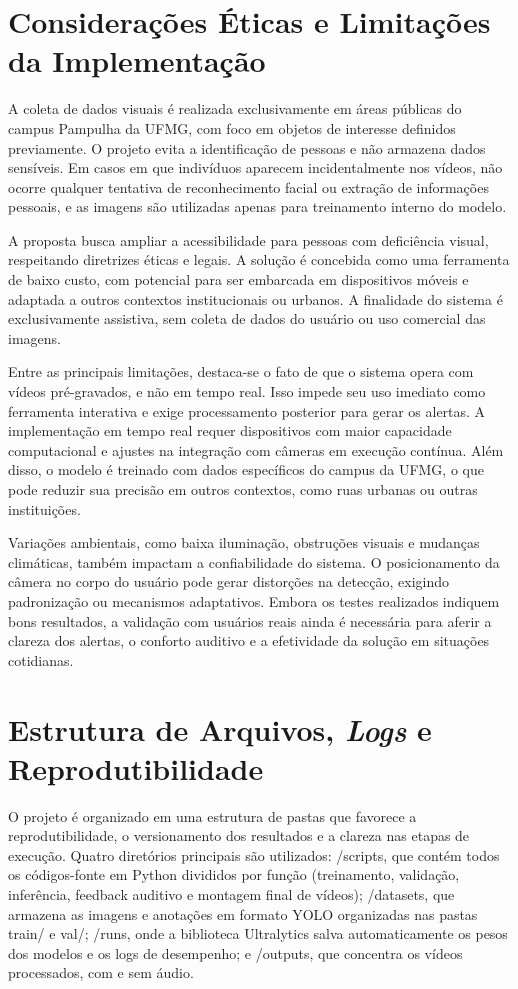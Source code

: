 \section{Considerações Éticas e Limitações da Implementação}

A coleta de dados visuais é realizada exclusivamente em áreas públicas do campus Pampulha da UFMG, com foco em objetos de interesse definidos previamente. O projeto evita a identificação de pessoas e não armazena dados sensíveis. Em casos em que indivíduos aparecem incidentalmente nos vídeos, não ocorre qualquer tentativa de reconhecimento facial ou extração de informações pessoais, e as imagens são utilizadas apenas para treinamento interno do modelo.

A proposta busca ampliar a acessibilidade para pessoas com deficiência visual, respeitando diretrizes éticas e legais. A solução é concebida como uma ferramenta de baixo custo, com potencial para ser embarcada em dispositivos móveis e adaptada a outros contextos institucionais ou urbanos. A finalidade do sistema é exclusivamente assistiva, sem coleta de dados do usuário ou uso comercial das imagens.

Entre as principais limitações, destaca-se o fato de que o sistema opera com vídeos pré-gravados, e não em tempo real. Isso impede seu uso imediato como ferramenta interativa e exige processamento posterior para gerar os alertas. A implementação em tempo real requer dispositivos com maior capacidade computacional e ajustes na integração com câmeras em execução contínua. Além disso, o modelo é treinado com dados específicos do campus da UFMG, o que pode reduzir sua precisão em outros contextos, como ruas urbanas ou outras instituições.

Variações ambientais, como baixa iluminação, obstruções visuais e mudanças climáticas, também impactam a confiabilidade do sistema. O posicionamento da câmera no corpo do usuário pode gerar distorções na detecção, exigindo padronização ou mecanismos adaptativos. Embora os testes realizados indiquem bons resultados, a validação com usuários reais ainda é necessária para aferir a clareza dos alertas, o conforto auditivo e a efetividade da solução em situações cotidianas.

\section{Estrutura de Arquivos, \textit{Logs} e Reprodutibilidade}

O projeto é organizado em uma estrutura de pastas que favorece a reprodutibilidade, o versionamento dos resultados e a clareza nas etapas de execução. Quatro diretórios principais são utilizados: /scripts, que contém todos os códigos-fonte em Python divididos por função (treinamento, validação, inferência, feedback auditivo e montagem final de vídeos); /datasets, que armazena as imagens e anotações em formato YOLO organizadas nas pastas train/ e val/; /runs, onde a biblioteca Ultralytics salva automaticamente os pesos dos modelos e os logs de desempenho; e /outputs, que concentra os vídeos processados, com e sem áudio.

